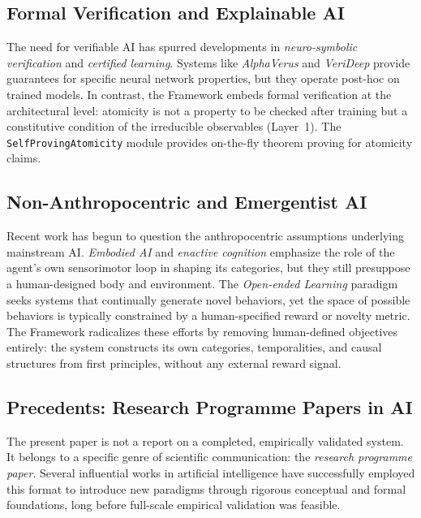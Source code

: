 \subsection{Formal Verification and Explainable AI}
The need for verifiable AI has spurred developments in \textit{neuro-symbolic verification} and \textit{certified learning}. Systems like \textit{AlphaVerus} \cite{wang2023} and \textit{VeriDeep} \cite{chen2024} provide guarantees for specific neural network properties, but they operate post-hoc on trained models. In contrast, the \Apeiron{} Framework embeds formal verification at the architectural level: atomicity is not a property to be checked after training but a constitutive condition of the irreducible observables (Layer~1). The \texttt{SelfProvingAtomicity} module provides on-the-fly theorem proving for atomicity claims.

\subsection{Non-Anthropocentric and Emergentist AI}
Recent work has begun to question the anthropocentric assumptions underlying mainstream AI. \textit{Embodied AI} and \textit{enactive cognition} \cite{thompson2007} emphasize the role of the agent's own sensorimotor loop in shaping its categories, but they still presuppose a human-designed body and environment. The \textit{Open-ended Learning} paradigm \cite{stanley2019} seeks systems that continually generate novel behaviors, yet the space of possible behaviors is typically constrained by a human-specified reward or novelty metric. The \Apeiron{} Framework radicalizes these efforts by removing human-defined objectives entirely: the system constructs its own categories, temporalities, and causal structures from first principles, without any external reward signal.

\subsection{Precedents: Research Programme Papers in AI}
\label{subsec:precedents}

The present paper is not a report on a completed, empirically validated system. It belongs to a specific genre of scientific communication: the \emph{research programme paper}. Several influential works in artificial intelligence have successfully employed this format to introduce new paradigms through rigorous conceptual and formal foundations, long before full-scale empirical validation was feasible.

